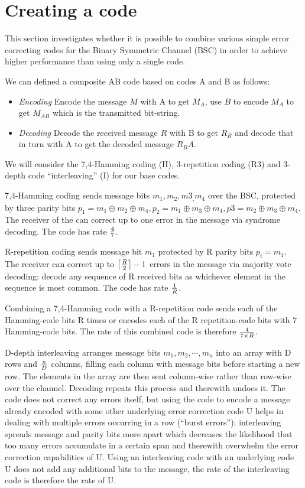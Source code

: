 \documentclass[10pt,a4paper,oneside,onecolumn]{article}
\begin{document}
\section{Creating a code}\label{sec:ex8}

This section investigates whether it is possible to combine various simple error
correcting codes for the Binary Symmetric Channel (BSC) in order to achieve
higher performance than using only a single code.

We can defined a composite AB code based on codes A and B as follows:
\begin{itemize}
\item \emph{Encoding} Encode the message $M$ with A to get $M_A$, use $B$ to
encode $M_A$ to get $M_{AB}$ which is the transmitted bit-string.
\item \emph{Decoding} Decode the received message $R$ with B to get $R_B$ and
decode that in turn with A to get the decoded message $R_BA$.
\end{itemize}
We will consider the 7,4-Hamming coding (H), 3-repetition coding (R3) and
3-depth code ``interleaving'' (I) for our base codes.

7,4-Hamming coding sends message bits $m_1, m_2, m3_, m_4$ over the BSC,
protected by three parity bits $p_1 = m_1 \oplus m_2 \oplus m_4, p_2 = m_1
\oplus m_3 \oplus m_4, p3 = m_2 \oplus m_3 \oplus m_4$. The receiver of the can
correct up to one error in the message via syndrome decoding. The code has rate
${4 \over 7}$.

R-repetition coding sends message bit $m_1$ protected by R parity bits $p_i =
m_1$. The receiver can correct up to $\left\lceil{R \over 2}\right\rceil - 1$
errors in the message via majority vote decoding: decode any sequence of R
received bits as whichever element in the sequence is most common. The code has
rate ${1 \over R}$.

Combining a 7,4-Hamming code with a R-repetition code sends each of the
Hamming-code bits R times or encodes each of the R repetition-code bits with 7
Hamming-code bits.  The rate of this combined code is therefore ${4 \over 7
\times R}$.

D-depth interleaving arranges message bits $m_1, m_2, \cdots, m_n$ into an array
with D rows and ${n \over D}$ columns, filling each column with message bits
before starting a new row. The elements in the array are then sent column-wise
rather than row-wise over the channel.  Decoding repeats this process and
therewith undoes it. The code does not correct any errors itself, but using the
code to encode a message already encoded with some other underlying error
correction code U helps in dealing with multiple errors occurring in a row
(``burst errors''): interleaving spreads message and parity bits more apart
which decreases the likelihood that too many errors accumulate in a certain span
and therewith overwhelm the error correction capabilities of U. Using an
interleaving code with an underlying code U does not add any additional bits to
the message, the rate of the interleaving code is therefore the rate of U.
\end{document}
